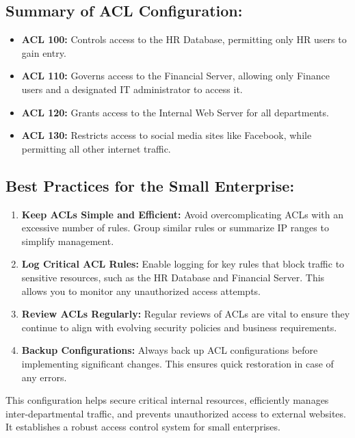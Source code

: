 \documentclass[11pt,a4paper]{article}
\begin{document}
    \subsection*{Summary of ACL Configuration:}
    \begin{itemize}
        \item \textbf{ACL 100:} Controls access to the HR Database, permitting only HR users to gain entry.
        \item \textbf{ACL 110:} Governs access to the Financial Server, allowing only Finance users and a designated IT administrator to access it.
        \item \textbf{ACL 120:} Grants access to the Internal Web Server for all departments.
        \item \textbf{ACL 130:} Restricts access to social media sites like Facebook, while permitting all other internet traffic.
    \end{itemize}

    \subsection*{Best Practices for the Small Enterprise:}
        \begin{enumerate}
            \item \textbf{Keep ACLs Simple and Efficient:} Avoid overcomplicating ACLs with an excessive number of rules. Group similar rules or summarize IP ranges to simplify management.

            \item \textbf{Log Critical ACL Rules:} Enable logging for key rules that block traffic to sensitive resources, such as the HR Database and Financial Server. This allows you to monitor any unauthorized access attempts.

            \item \textbf{Review ACLs Regularly:} Regular reviews of ACLs are vital to ensure they continue to align with evolving security policies and business requirements.

            \item \textbf{Backup Configurations:} Always back up ACL configurations before implementing significant changes. This ensures quick restoration in case of any errors.

        \end{enumerate}

    This configuration helps secure critical internal resources, efficiently manages inter-departmental traffic, and prevents unauthorized access to external websites. It establishes a robust access control system for small enterprises.
\end{document}
